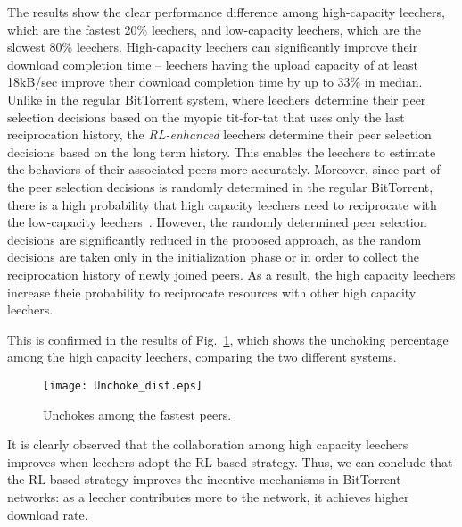 The results show the clear performance difference among high-capacity leechers, 
which are the fastest 20\% leechers, and low-capacity leechers, which are the 
slowest 80\% leechers. 
High-capacity leechers can significantly improve their download
completion time -- leechers having the upload capacity of at least 18kB/sec 
improve their download completion time by up to 33\% in median. 
Unlike in the regular BitTorrent system, where leechers determine their peer 
selection decisions based on the myopic tit-for-tat that uses only the last 
reciprocation history, the \emph{RL-enhanced} leechers determine their peer 
selection decisions based on the long term history. This enables the leechers 
to estimate the behaviors of their associated peers more accurately. Moreover, 
since part of the peer selection decisions is randomly determined in the 
regular BitTorrent, there is a high probability that high capacity leechers 
need to reciprocate with the low-capacity leechers~\cite{piatek07}. 
However, the randomly determined peer selection decisions are significantly 
reduced in the proposed approach, as the random decisions are taken only in the 
initialization phase or in order to collect the reciprocation history of newly 
joined peers. 
As a result, the high capacity leechers increase theie probability to 
reciprocate resources with other high capacity leechers.

This is confirmed in the results of Fig.~\ref{fig:Unchoke_dist}, which shows 
the unchoking percentage among the  high capacity leechers, 
comparing the two different systems.
\begin{figure}[t]
\centering
\texttt{[image: Unchoke\_dist.eps]}
\caption{Unchokes among the  fastest peers.} 
\label{fig:Unchoke_dist}
\end{figure}
It is clearly observed that the collaboration among high capacity leechers 
improves when leechers adopt the RL-based strategy. 
Thus, we can conclude that the RL-based strategy improves the 
incentive mechanisms in BitTorrent networks: as a leecher contributes more to 
the network, it achieves higher download rate. 

